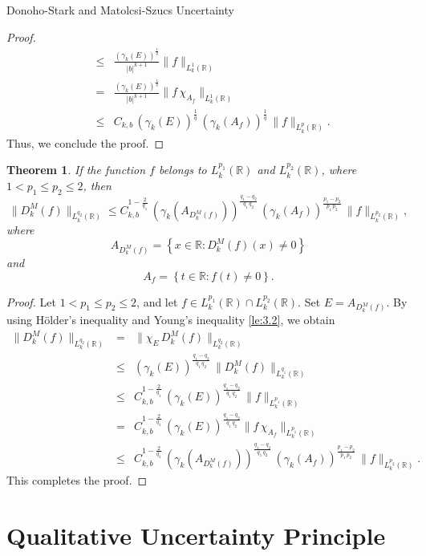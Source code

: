 \documentclass[12pt,a4paper,reqno]{amsproc}
\newtheorem{theorem}{Theorem}[section]
\theoremstyle{definition}
\theoremstyle{remark}
\numberwithin{equation}{section}
\begin{document}
\begin{subsection}{Donoho-Stark and Matolcsi-Szucs Uncertainty}
\begin{proof}
\begin{eqnarray*}
        &\le& \frac{ (\gamma_k(E))^{\frac{1}{q}}}{|b|^{k+1}}\|f\|_{L_k^1(\mathbb{R})}\\
        &=& \frac{ (\gamma_k(E))^{\frac{1}{q}}}{|b|^{k+1}}\|f\,\chi_{A_f}\|_{L_k^1(\mathbb{R})}\\
        &\le&  C_{k,b}\,(\gamma_k(E))^{\frac{1}{q}}\, (\gamma_k(A_f))^{\frac{1}{q}}\, \|f\|_{L_k^p(\mathbb{R})}.
    \end{eqnarray*}
    Thus, we conclude the proof.
\end{proof}
\begin{theorem}
If the function  $f$ belongs to $ L_k^{p_1}(\mathbb{R})$ and $L_k^{p_2}(\mathbb{R})$, where  $1<p_1\le p_2 \le 2$, then 
\begin{equation*}
     \|D_k^M(f)\|_{L_k^{q_2}(\mathbb{R})} \le C_{k,b}^{1-\frac{2}{q_1}}\, (\gamma_k(A_{D_k^M(f)}))^{\frac{q_1-q_2}{q_1\,q_2}}\, (\gamma_k(A_f))^{\frac{p_1-p_2}{p_1\,p_2}}\, \|f\|_{L^{p_2}_k(\mathbb{R})},
\end{equation*}
where $$A_{D_k^M(f)}= \left\{x\in \mathbb{R}: D_k^M(f)(x) \neq 0\right\}$$ and $$A_f = \left\{ t
\in \mathbb{R}:f(t)\neq0\right\}.$$
\end{theorem}
\begin{proof}
    Let  $ 1<p_1\le p_2 \le 2$, and let $f\in  L_k^{p_1}(\mathbb{R})\cap L_k^{p_2}(\mathbb{R})$. Set $E=A_{D_k^M(f)}$. By using H{\"o}lder's inequality and Young's inequality \eqref{le:3.2}, we obtain 
    \begin{eqnarray*}
        \|D_k^M(f)\|_{L_k^{q_2}(\mathbb{R})} &=& \|\chi_E\, D_k^M(f)\|_{L_k^{q_2}(\mathbb{R})}\\
        &\le&  (\gamma_k(E))^{\frac{q_1-q_2}{q_1\,q_2}}\, \|D_k^M(f)\|_{L^{q_1}_k(\mathbb{R})}\\
        &\le& C_{k,b}^{1-\frac{2}{q_1}}\,(\gamma_k(E))^{\frac{q_1-q_2}{q_1\,q_2}}\, \|f\|_{L^{p_1}_k(\mathbb{R})}\\
         &=& C_{k,b}^{1-\frac{2}{q_1}}\,(\gamma_k(E))^{\frac{q_1-q_2}{q_1\,q_2}} \|f\,\chi_{A_f}\|_{L^{p_1}_k(\mathbb{R})}\\
        &\le&   C_{k,b}^{1-\frac{2}{q_1}}\,(\gamma_k(A_{D_k^M(f)}))^{\frac{q_1-q_2}{q_1\,q_2}}\, (\gamma_k(A_f))^{\frac{p_1-p_2}{p_1\,p_2}}\, \|f\|_{L^{p_2}_k(\mathbb{R})}.
    \end{eqnarray*}
    This completes the proof.
\end{proof}
\end{subsection}
\section{Qualitative Uncertainty Principle} \label{S:3}
 
\end{document}
